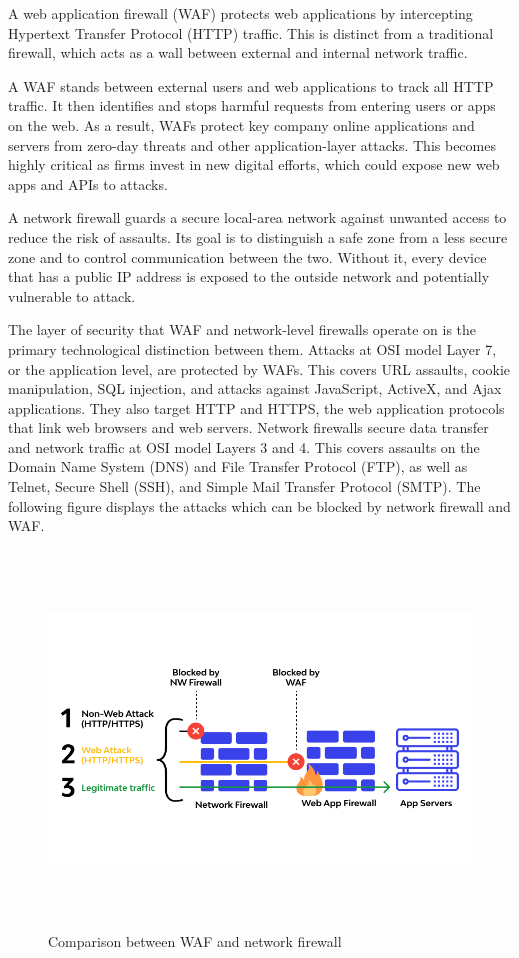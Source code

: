 A web application firewall (WAF) protects web applications by intercepting Hypertext Transfer Protocol (HTTP) traffic. This is distinct from a traditional firewall, which acts as a wall between external and internal network traffic.

A WAF stands between external users and web applications to track all HTTP traffic. It then identifies and stops harmful requests from entering users or apps on the web. As a result, WAFs protect key company online applications and servers from zero-day threats and other application-layer attacks. This becomes highly critical as firms invest in new digital efforts, which could expose new web apps and APIs to attacks.

A network firewall guards a secure local-area network against unwanted access to reduce the risk of assaults. Its goal is to distinguish a safe zone from a less secure zone and to control communication between the two. Without it, every device that has a public IP address is exposed to the outside network and potentially vulnerable to attack.

The layer of security that WAF and network-level firewalls operate on is the primary technological distinction between them. Attacks at OSI model Layer 7, or the application level, are protected by WAFs. This covers URL assaults, cookie manipulation, SQL injection, and attacks against JavaScript, ActiveX, and Ajax applications. They also target HTTP and HTTPS, the web application protocols that link web browsers and web servers. Network firewalls secure data transfer and network traffic at OSI model Layers 3 and 4. This covers assaults on the Domain Name System (DNS) and File Transfer Protocol (FTP), as well as Telnet, Secure Shell (SSH), and Simple Mail Transfer Protocol (SMTP). The following figure displays the attacks which can be blocked by network firewall and WAF.

\begin{figure}[h!]
	\centering
	\includegraphics[width=\linewidth, height=10cm,keepaspectratio]{figures/waf3.png}
	\caption{Comparison between WAF and network firewall}
\end{figure}
\newpage


